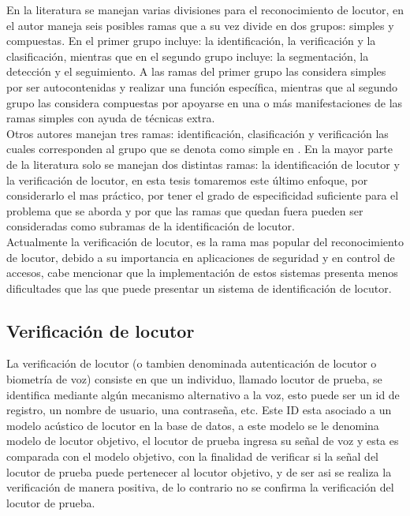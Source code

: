 En la literatura se manejan varias divisiones para el reconocimiento de locutor, en \cite{beigi2011} el autor maneja seis posibles ramas que a su vez divide en dos grupos: simples y compuestas. En el primer grupo incluye: la identificaci\'on, la verificaci\'on y la clasificaci\'on, mientras que en el segundo grupo incluye: la segmentaci\'on, la detecci\'on y el seguimiento. A las ramas del primer grupo las considera simples por ser autocontenidas y realizar una funci\'on espec\'ifica, mientras que al segundo grupo las considera compuestas por apoyarse en una o m\'as manifestaciones de las ramas simples con ayuda de t\'ecnicas extra.\\ 

Otros autores \cite{reynolds2002} manejan tres ramas: identificaci\'on, clasificaci\'on y verificaci\'on las cuales corresponden al grupo que se denota como simple en \cite{beigi2011}. En la mayor parte de la literatura solo se manejan dos distintas ramas: la identificaci\'on de locutor y la verificaci\'on de locutor, en esta tesis tomaremos este \'ultimo enfoque, por considerarlo el mas pr\'actico, por tener el grado de especificidad suficiente para el problema que se aborda y por que las ramas que quedan fuera pueden ser consideradas como subramas de la identificaci\'on de locutor. \\

Actualmente la verificaci\'on de locutor, es la rama mas popular del reconocimiento de locutor, debido a su importancia en aplicaciones de seguridad y en control de accesos, cabe mencionar que la implementaci\'on de estos sistemas presenta menos dificultades que las que puede presentar un sistema de identificaci\'on de locutor.

\subsection{Verificaci\'on de locutor}
La verificaci\'on de locutor (o tambien denominada autenticaci\'on de locutor o biometr\'ia de voz) consiste en que un individuo, llamado locutor de prueba, se identifica mediante alg\'un mecanismo alternativo a la voz, esto puede ser un id de registro, un nombre de usuario, una contraseña, etc. Este ID esta asociado a un modelo ac\'ustico de locutor en la base de datos, a este modelo se le denomina modelo de locutor objetivo, el locutor de prueba ingresa su señal de voz y esta es comparada con el modelo objetivo, con la finalidad de verificar si la señal del locutor de prueba puede pertenecer al locutor objetivo, y de ser asi se realiza la verificaci\'on de manera positiva, de lo contrario no se confirma la verificaci\'on del locutor de prueba.\\

